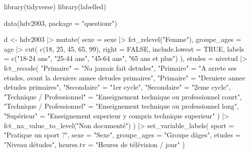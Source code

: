 \documentclass[
  letterpaper,
  DIV=11,
  numbers=noendperiod,
  oneside]{scrreprt}
\newenvironment{Shaded}{\begin{snugshade}}{\end{snugshade}}
\newcommand{\AttributeTok}[1]{\textcolor[rgb]{0.40,0.45,0.13}{#1}}
\newcommand{\ConstantTok}[1]{\textcolor[rgb]{0.56,0.35,0.01}{#1}}
\newcommand{\DecValTok}[1]{\textcolor[rgb]{0.68,0.00,0.00}{#1}}
\newcommand{\FunctionTok}[1]{\textcolor[rgb]{0.28,0.35,0.67}{#1}}
\newcommand{\NormalTok}[1]{\textcolor[rgb]{0.00,0.23,0.31}{#1}}
\newcommand{\OtherTok}[1]{\textcolor[rgb]{0.00,0.23,0.31}{#1}}
\newcommand{\SpecialCharTok}[1]{\textcolor[rgb]{0.37,0.37,0.37}{#1}}
\newcommand{\StringTok}[1]{\textcolor[rgb]{0.13,0.47,0.30}{#1}}
\begin{document}
\begin{Shaded}
\begin{Highlighting}[]
\FunctionTok{library}\NormalTok{(tidyverse)}
\FunctionTok{library}\NormalTok{(labelled)}

\FunctionTok{data}\NormalTok{(hdv2003, }\AttributeTok{package =} \StringTok{"questionr"}\NormalTok{)}

\NormalTok{d }\OtherTok{\textless{}{-}}
\NormalTok{  hdv2003 }\SpecialCharTok{|\textgreater{}} 
  \FunctionTok{mutate}\NormalTok{(}
    \AttributeTok{sexe =}\NormalTok{ sexe }\SpecialCharTok{|\textgreater{}} \FunctionTok{fct\_relevel}\NormalTok{(}\StringTok{"Femme"}\NormalTok{),}
    \AttributeTok{groupe\_ages =}\NormalTok{ age }\SpecialCharTok{|\textgreater{}}
      \FunctionTok{cut}\NormalTok{(}
        \FunctionTok{c}\NormalTok{(}\DecValTok{18}\NormalTok{, }\DecValTok{25}\NormalTok{, }\DecValTok{45}\NormalTok{, }\DecValTok{65}\NormalTok{, }\DecValTok{99}\NormalTok{),}
        \AttributeTok{right =} \ConstantTok{FALSE}\NormalTok{,}
        \AttributeTok{include.lowest =} \ConstantTok{TRUE}\NormalTok{,}
        \AttributeTok{labels =} \FunctionTok{c}\NormalTok{(}\StringTok{"18{-}24 ans"}\NormalTok{, }\StringTok{"25{-}44 ans"}\NormalTok{,}
                   \StringTok{"45{-}64 ans"}\NormalTok{, }\StringTok{"65 ans et plus"}\NormalTok{)}
\NormalTok{      ),}
    \AttributeTok{etudes =}\NormalTok{ nivetud }\SpecialCharTok{|\textgreater{}} 
      \FunctionTok{fct\_recode}\NormalTok{(}
        \StringTok{"Primaire"} \OtherTok{=} \StringTok{"N\textquotesingle{}a jamais fait d\textquotesingle{}etudes"}\NormalTok{,}
        \StringTok{"Primaire"} \OtherTok{=} \StringTok{"A arrete ses etudes, avant la derniere annee d\textquotesingle{}etudes primaires"}\NormalTok{,}
        \StringTok{"Primaire"} \OtherTok{=} \StringTok{"Derniere annee d\textquotesingle{}etudes primaires"}\NormalTok{,}
        \StringTok{"Secondaire"} \OtherTok{=} \StringTok{"1er cycle"}\NormalTok{,}
        \StringTok{"Secondaire"} \OtherTok{=} \StringTok{"2eme cycle"}\NormalTok{,}
        \StringTok{"Technique / Professionnel"} \OtherTok{=} \StringTok{"Enseignement technique ou professionnel court"}\NormalTok{,}
        \StringTok{"Technique / Professionnel"} \OtherTok{=} \StringTok{"Enseignement technique ou professionnel long"}\NormalTok{,}
        \StringTok{"Supérieur"} \OtherTok{=} \StringTok{"Enseignement superieur y compris technique superieur"}
\NormalTok{    ) }\SpecialCharTok{|\textgreater{}} 
    \FunctionTok{fct\_na\_value\_to\_level}\NormalTok{(}\StringTok{"Non documenté"}\NormalTok{)  }
\NormalTok{  ) }\SpecialCharTok{|\textgreater{}} 
  \FunctionTok{set\_variable\_labels}\NormalTok{(}
    \AttributeTok{sport =} \StringTok{"Pratique un sport ?"}\NormalTok{,}
    \AttributeTok{sexe =} \StringTok{"Sexe"}\NormalTok{,}
    \AttributeTok{groupe\_ages =} \StringTok{"Groupe d\textquotesingle{}âges"}\NormalTok{,}
    \AttributeTok{etudes =} \StringTok{"Niveau d\textquotesingle{}études"}\NormalTok{,}
    \AttributeTok{heures.tv =} \StringTok{"Heures de télévision / jour"}
\NormalTok{  )}


\end{Highlighting}
\end{Shaded}
\end{document}
